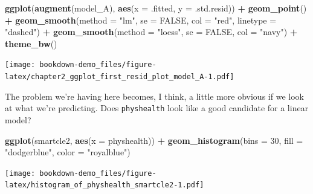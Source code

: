 \documentclass[]{book}
\newenvironment{Shaded}{\begin{snugshade}}{\end{snugshade}}
\newcommand{\KeywordTok}[1]{\textcolor[rgb]{0.13,0.29,0.53}{\textbf{#1}}}
\newcommand{\DataTypeTok}[1]{\textcolor[rgb]{0.13,0.29,0.53}{#1}}
\newcommand{\DecValTok}[1]{\textcolor[rgb]{0.00,0.00,0.81}{#1}}
\newcommand{\StringTok}[1]{\textcolor[rgb]{0.31,0.60,0.02}{#1}}
\newcommand{\OtherTok}[1]{\textcolor[rgb]{0.56,0.35,0.01}{#1}}
\newcommand{\OperatorTok}[1]{\textcolor[rgb]{0.81,0.36,0.00}{\textbf{#1}}}
\newcommand{\NormalTok}[1]{#1}
\theoremstyle{definition}
\theoremstyle{definition}
\theoremstyle{definition}
\theoremstyle{remark}
\begin{document}
\begin{Shaded}
\begin{Highlighting}[]
\KeywordTok{ggplot}\NormalTok{(}\KeywordTok{augment}\NormalTok{(model_A), }\KeywordTok{aes}\NormalTok{(}\DataTypeTok{x =}\NormalTok{ .fitted, }\DataTypeTok{y =}\NormalTok{ .std.resid)) }\OperatorTok{+}
\StringTok{    }\KeywordTok{geom_point}\NormalTok{() }\OperatorTok{+}
\StringTok{    }\KeywordTok{geom_smooth}\NormalTok{(}\DataTypeTok{method =} \StringTok{"lm"}\NormalTok{, }\DataTypeTok{se =} \OtherTok{FALSE}\NormalTok{, }\DataTypeTok{col =} \StringTok{"red"}\NormalTok{, }\DataTypeTok{linetype =} \StringTok{"dashed"}\NormalTok{) }\OperatorTok{+}
\StringTok{    }\KeywordTok{geom_smooth}\NormalTok{(}\DataTypeTok{method =} \StringTok{"loess"}\NormalTok{, }\DataTypeTok{se =} \OtherTok{FALSE}\NormalTok{, }\DataTypeTok{col =} \StringTok{"navy"}\NormalTok{) }\OperatorTok{+}
\StringTok{    }\KeywordTok{theme_bw}\NormalTok{()}
\end{Highlighting}
\end{Shaded}

\texttt{[image: bookdown-demo\_files/figure-latex/chapter2\_ggplot\_first\_resid\_plot\_model\_A-1.pdf]}

The problem we're having here becomes, I think, a little more obvious if
we look at what we're predicting. Does \texttt{physhealth} look like a
good candidate for a linear model?

\begin{Shaded}
\begin{Highlighting}[]
\KeywordTok{ggplot}\NormalTok{(smartcle2, }\KeywordTok{aes}\NormalTok{(}\DataTypeTok{x =}\NormalTok{ physhealth)) }\OperatorTok{+}
\KeywordTok{geom_histogram}\NormalTok{(}\DataTypeTok{bins =} \DecValTok{30}\NormalTok{, }\DataTypeTok{fill =} \StringTok{"dodgerblue"}\NormalTok{, }\DataTypeTok{color =} \StringTok{"royalblue"}\NormalTok{)}
\end{Highlighting}
\end{Shaded}

\texttt{[image: bookdown-demo\_files/figure-latex/histogram\_of\_physhealth\_smartcle2-1.pdf]}

\begin{Shaded}
\end{Shaded}
\end{document}

